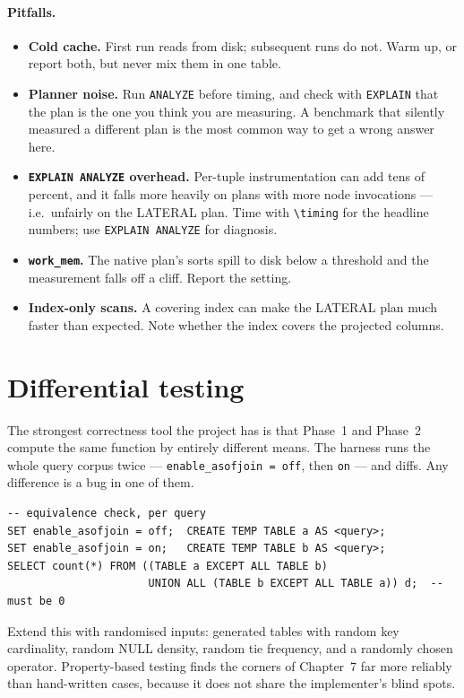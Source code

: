 \documentclass[11pt,a4paper]{report}
\theoremstyle{definition}
\theoremstyle{plain}
\newcommand{\code}[1]{\texttt{\small #1}}
\begin{document}
\paragraph{Pitfalls.}
\begin{itemize}[nosep]
\item \textbf{Cold cache.} First run reads from disk; subsequent runs do not. Warm up, or
      report both, but never mix them in one table.
\item \textbf{Planner noise.} Run \code{ANALYZE} before timing, and check with
      \code{EXPLAIN} that the plan is the one you think you are measuring. A benchmark that
      silently measured a different plan is the most common way to get a wrong answer here.
\item \textbf{\code{EXPLAIN ANALYZE} overhead.} Per-tuple instrumentation can add tens of
      percent, and it falls more heavily on plans with more node invocations --- i.e.\
      unfairly on the LATERAL plan. Time with \code{\textbackslash timing} for the headline
      numbers; use \code{EXPLAIN ANALYZE} for diagnosis.
\item \textbf{\code{work\_mem}.} The native plan's sorts spill to disk below a threshold and
      the measurement falls off a cliff. Report the setting.
\item \textbf{Index-only scans.} A covering index can make the LATERAL plan much faster than
      expected. Note whether the index covers the projected columns.
\end{itemize}

\section{Differential testing}

The strongest correctness tool the project has is that Phase~1 and Phase~2 compute the same
function by entirely different means. The harness runs the whole query corpus twice ---
\code{enable\_asofjoin = off}, then \code{on} --- and diffs. Any difference is a bug in one
of them.

\begin{lstlisting}
-- equivalence check, per query
SET enable_asofjoin = off;  CREATE TEMP TABLE a AS <query>;
SET enable_asofjoin = on;   CREATE TEMP TABLE b AS <query>;
SELECT count(*) FROM ((TABLE a EXCEPT ALL TABLE b)
                      UNION ALL (TABLE b EXCEPT ALL TABLE a)) d;  -- must be 0
\end{lstlisting}

Extend this with randomised inputs: generated tables with random key cardinality, random
NULL density, random tie frequency, and a randomly chosen operator. Property-based testing
finds the corners of Chapter~7 far more reliably than hand-written cases, because it does
not share the implementer's blind spots.
\end{document}

